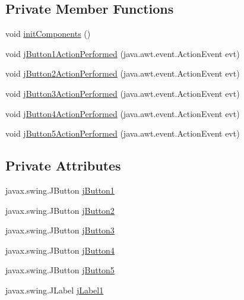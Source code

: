 \subsection*{Private Member Functions}
\begin{DoxyCompactItemize}
\item 
void \mbox{\hyperlink{class_interfaz_package_1_1_interfaz_alta_aac245148fe9ffbe8e56f0380a41abc9c}{init\+Components}} ()
\item 
void \mbox{\hyperlink{class_interfaz_package_1_1_interfaz_alta_a70858cd5c6c13a2e218388ace83d9041}{j\+Button1\+Action\+Performed}} (java.\+awt.\+event.\+Action\+Event evt)
\item 
void \mbox{\hyperlink{class_interfaz_package_1_1_interfaz_alta_ae07fdac3530bdd87b8a2c9ca7705ea61}{j\+Button2\+Action\+Performed}} (java.\+awt.\+event.\+Action\+Event evt)
\item 
void \mbox{\hyperlink{class_interfaz_package_1_1_interfaz_alta_a2f5ffffe991863a26854f54c1f62dbad}{j\+Button3\+Action\+Performed}} (java.\+awt.\+event.\+Action\+Event evt)
\item 
void \mbox{\hyperlink{class_interfaz_package_1_1_interfaz_alta_a11278134da20d54ada1b395cba82595a}{j\+Button4\+Action\+Performed}} (java.\+awt.\+event.\+Action\+Event evt)
\item 
void \mbox{\hyperlink{class_interfaz_package_1_1_interfaz_alta_a6716900585168bc0e5176c89fe07efa7}{j\+Button5\+Action\+Performed}} (java.\+awt.\+event.\+Action\+Event evt)
\end{DoxyCompactItemize}
\subsection*{Private Attributes}
\begin{DoxyCompactItemize}
\item 
javax.\+swing.\+J\+Button \mbox{\hyperlink{class_interfaz_package_1_1_interfaz_alta_a04cc5364c89f6cbda8e46022ea7ddbf4}{j\+Button1}}
\item 
javax.\+swing.\+J\+Button \mbox{\hyperlink{class_interfaz_package_1_1_interfaz_alta_a1657bb8744ea591f1eb9e70c5c570169}{j\+Button2}}
\item 
javax.\+swing.\+J\+Button \mbox{\hyperlink{class_interfaz_package_1_1_interfaz_alta_a2bce273c449eda774b687351d594071c}{j\+Button3}}
\item 
javax.\+swing.\+J\+Button \mbox{\hyperlink{class_interfaz_package_1_1_interfaz_alta_a1766bf9cf73dcb04fa55a88750a864f5}{j\+Button4}}
\item 
javax.\+swing.\+J\+Button \mbox{\hyperlink{class_interfaz_package_1_1_interfaz_alta_a368946c13229a442a7633f37c8fa0425}{j\+Button5}}
\item 
javax.\+swing.\+J\+Label \mbox{\hyperlink{class_interfaz_package_1_1_interfaz_alta_a353b3664adfc462e1ec4be9e78f5da33}{j\+Label1}}
\end{DoxyCompactItemize}


